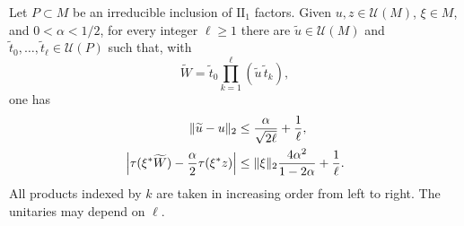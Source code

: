 \begin{proposition}\label{prop:perturbation}
Let $P\subset M$ be an irreducible inclusion of $\mathrm{II}_1$ factors.
Given $u,z\in\mathcal U(M)$, $\xi\in M$, and $0<\alpha<1/2$,
for every integer $\ell\ge1$ there are
$\widetilde u\in\mathcal U(M)$ and
$\widetilde t_0,\ldots,\widetilde t_\ell\in\mathcal U(P)$ such that,
with
\[
  \widetilde W=\widetilde t_0
     \prod_{k=1}^{\ell}(\widetilde u\,\widetilde t_k),
\]
one has
\begin{equation}\label{eq:perturbation-bounds}
\begin{aligned}
  \lVert \widetilde u-u\rVert_2
    &\le \frac{\alpha}{\sqrt{2\ell}}+\frac1\ell,\\
  \left|\tau(\xi^*\widetilde W)
           -\frac\alpha2\tau(\xi^*z)\right|
    &\le \lVert \xi\rVert_2\frac{4\alpha^2}{1-2\alpha}+\frac1\ell.
\end{aligned}
\end{equation}
All products indexed by $k$ are taken in increasing order from left
to right.  The unitaries may depend on $\ell$.
\end{proposition}


